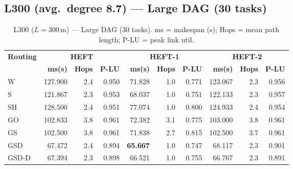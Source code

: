 \documentclass[11pt]{article}
\newcommand{\win}[1]{\textcolor{green!50!black}{\textbf{#1}}}
\newcommand{\bad}[1]{\textcolor{red!70!black}{#1}}
\begin{document}
\subsection{L300 (avg.\ degree 8.7) --- Large DAG (30 tasks)}
\begin{table}[H]
\centering\small
\begin{tabular}{l r r r r r r r r r}
\toprule
\textbf{Routing} & \multicolumn{3}{c}{\textbf{HEFT}} & \multicolumn{3}{c}{\textbf{HEFT-1}} & \multicolumn{3}{c}{\textbf{HEFT-2}} \\
\cmidrule(lr){2-4}\cmidrule(lr){5-7}\cmidrule(lr){8-10}
& \textbf{ms(s)} & \textbf{Hops} & \textbf{P-LU} & \textbf{ms(s)} & \textbf{Hops} & \textbf{P-LU} & \textbf{ms(s)} & \textbf{Hops} & \textbf{P-LU} \\
\midrule
  W & 127.900 & 2.4 & 0.950 & 71.828 & 1.0 & 0.771 & 123.067 & 2.3 & 0.956 \\
  S & 121.867 & 2.3 & 0.953 & 68.037 & 1.0 & 0.751 & 122.133 & 2.3 & 0.957 \\
  SH & \bad{128.500} & 2.4 & 0.951 & \bad{77.074} & 1.0 & 0.800 & \bad{124.933} & 2.4 & 0.954 \\
  GO & 102.833 & 3.8 & 0.961 & 72.382 & 3.1 & 0.775 & 103.000 & 3.8 & 0.961 \\
  GS & 102.500 & 3.8 & 0.961 & 71.838 & 2.7 & 0.815 & 102.500 & 3.7 & 0.961 \\
  GSD & 67.472 & 2.4 & 0.894 & \win{65.667} & 1.0 & 0.747 & 68.117 & 2.3 & 0.901 \\
  GSD-D & 67.394 & 2.3 & 0.898 & 66.521 & 1.0 & 0.755 & 66.767 & 2.3 & 0.891 \\
\bottomrule
\end{tabular}
\caption{L300 ($L=300$\,m) --- Large DAG (30 tasks). ms = makespan (s); Hops = mean path length; P-LU = peak link util.}
\end{table}
\end{document}
